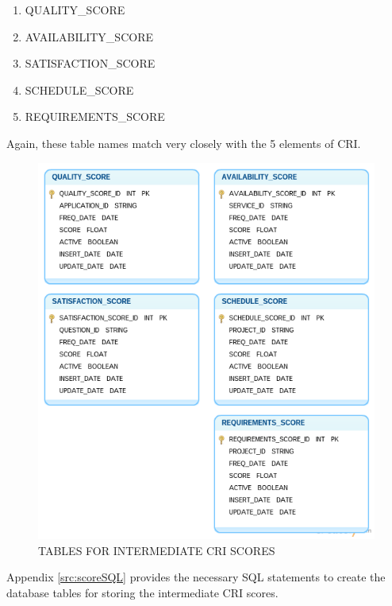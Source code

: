 \documentclass[SDSUThesis.tex]{subfiles}
\begin{document}
            \begin{enumerate}
                \item QUALITY\_SCORE
                \item AVAILABILITY\_SCORE
                \item SATISFACTION\_SCORE
                \item SCHEDULE\_SCORE
                \item REQUIREMENTS\_SCORE
            \end{enumerate}
            Again, these table names match very closely with the 5 elements of CRI.
        
           \begin{figure}[htb]
                \centering
                \includegraphics[scale=.52]{images/score_tables.png}
                \caption{TABLES FOR INTERMEDIATE CRI SCORES}
                \label{fig:score_tables}
            \end{figure}%
            
            Appendix \ref{src:scoreSQL} provides the necessary SQL statements to create the 
            database tables for storing the intermediate CRI scores.
        
\end{document}
